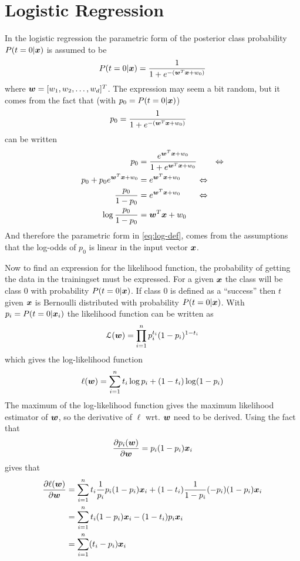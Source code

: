\section{Logistic Regression}
In the logistic regression the parametric form of the posterior class probability $P(t=0|\boldsymbol{x})$ is assumed to be
\begin{equation}\label{eq:log-def}
    P(t=0|\boldsymbol{x}) = \frac{1}{1+e^{-(\boldsymbol{w}^T\boldsymbol{x}+w_0)}}
\end{equation}
where $\boldsymbol{w}=[w_1, w_2, \dots, w_d]^T$. The expression may seem a bit random, but it comes from the fact that (with $p_0=P(t=0|\boldsymbol{x})$)
\begin{align*}
    p_0 &= \frac{1}{1+e^{-(\boldsymbol{w}^T\boldsymbol{x}+w_0)}} 
\end{align*}
can be written
\begin{align*}
    p_0 &= \frac{e^{\boldsymbol{w}^T\boldsymbol{x}+w_0}}{1+e^{\boldsymbol{w}^T\boldsymbol{x}+w_0}} \quad\quad\Leftrightarrow \\
    p_0 + p_0e^{\boldsymbol{w}^T\boldsymbol{x}+w_0} &= e^{\boldsymbol{w}^T\boldsymbol{x}+w_0} \quad\quad\Leftrightarrow \\
    \frac{p_0}{1-p_0} &= e^{\boldsymbol{w}^T\boldsymbol{x}+w_0} \quad\quad\Leftrightarrow \\
    \log \frac{p_0}{1-p_0} &= \boldsymbol{w}^T\boldsymbol{x}+w_0
\end{align*}
And therefore the parametric form in \eqref{eq:log-def}, comes from the assumptions that the log-odds of $p_0$ is linear in the input vector $\boldsymbol{x}$. \par
Now to find an expression for the likelihood function, the probability of getting the data in the trainingset must be expressed. For a given $\boldsymbol{x}$ the class will be class 0 with probability $P(t=0|\boldsymbol{x})$. If class 0 is defined as a ``success'' then $t$ given $\boldsymbol{x}$ is Bernoulli distributed with probability $P(t=0|\boldsymbol{x})$. With $p_i=P(t=0|\boldsymbol{x}_i)$ the likelihood function can be written as
\[
    \mathcal{L}(\boldsymbol{w}) = \prod_{i=1}^n p_i^{t_i}(1-p_i)^{1-t_i}
\]
which gives the log-likelihood function
\begin{equation}\label{eq:log-like-logistic}
    \ell(\boldsymbol{w}) = \sum_{i=1}^n t_i\log p_i + (1-t_i)\log(1-p_i)
\end{equation}
The maximum of the log-likelihood function gives the maximum likelihood estimator of $\boldsymbol{w}$, so the derivative of $\ell$ wrt. $\boldsymbol{w}$ need to be derived. Using the fact that
\begin{equation}\label{eq:sigmoid-derivative}
    \frac{\partial p_i(\boldsymbol{w})}{\partial \boldsymbol{w}} = p_i(1-p_i)\boldsymbol{x}_i
\end{equation}
gives that
\begin{align*}
    \frac{\partial \ell(\boldsymbol{w})}{\partial\boldsymbol{w}} &= \sum_{i=1}^n t_i \frac{1}{p_i}p_i(1-p_i)\boldsymbol{x}_i + (1-t_i)\frac{1}{1-p_i}(-p_i)(1-p_i)\boldsymbol{x}_i \\
    &= \sum_{i=1}^n t_i(1-p_i)\boldsymbol{x}_i - (1-t_i)p_i\boldsymbol{x}_i \\
    &= \sum_{i=1}^n (t_i-p_i)\boldsymbol{x}_i
\end{align*}

